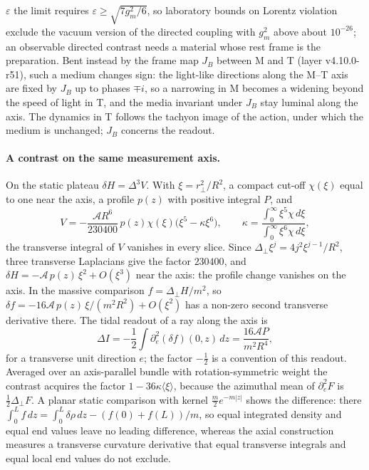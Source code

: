 \(\varepsilon\) the limit requires \(\varepsilon\ge\sqrt{7g_m^2/6}\), so laboratory bounds on Lorentz
violation exclude the vacuum version of the directed coupling with
\(g_m^2\) above about \(10^{-26}\); an observable directed contrast needs a
material whose rest frame is the preparation.  Bent instead by the frame
map \(J_B\) between M and T (layer v4.10.0-r51), such a medium changes sign:
the light-like directions along the M--T axis are fixed by \(J_B\) up to
phases \(\mp i\), so a narrowing in M becomes a widening beyond the speed of
light in T, and the media invariant under \(J_B\) stay luminal along the
axis.  The dynamics in T follows the tachyon image of the action, under
which the medium is unchanged; \(J_B\) concerns the readout.

\paragraph{A contrast on the same measurement axis.}
On the static plateau $\delta H=\Delta^3V$. With $\xi=r_\perp^2/R^2$, a
compact cut-off $\chi(\xi)$ equal to one near the axis, a profile $p(z)$
with positive integral $P$, and
\[
 V=-\frac{\mathcal A R^6}{230400}\,p(z)\chi(\xi)\bigl(\xi^5-\kappa\xi^6\bigr),
 \qquad
 \kappa=\frac{\int_0^\infty\xi^5\chi\,d\xi}{\int_0^\infty\xi^6\chi\,d\xi},
\]
the transverse integral of $V$ vanishes in every slice. Since
$\Delta_\perp\xi^j=4j^2\xi^{j-1}/R^2$, three transverse Laplacians give
the factor $230400$, and $\delta H=-\mathcal A\,p(z)\,\xi^2+O(\xi^3)$ near the
axis: the profile change vanishes on the axis. In the massive comparison
$f=\Delta_\perp H/m^2$, so $\delta f=-16\mathcal A\,p(z)\,\xi/(m^2R^2)+O(\xi^2)$
has a non-zero second transverse derivative there. The tidal readout of
a ray along the axis is
\[
 \Delta I=-\frac12\int\partial_e^2(\delta f)(0,z)\,dz
         =\frac{16\mathcal A P}{m^2R^4},
\]
for a transverse unit direction $e$; the factor $-\tfrac12$ is a
convention of this readout. Averaged over an axis-parallel bundle with
rotation-symmetric weight the contrast acquires the factor
$1-36\kappa\langle\xi\rangle$, because the azimuthal mean of $\partial_e^2F$ is
$\tfrac12\Delta_\perp F$. A planar static comparison with kernel
$\tfrac m2e^{-m|z|}$ shows the difference: there
$\int_0^Lf\,dz=\int_0^L\delta\rho\,dz-(f(0)+f(L))/m$, so equal
integrated density and equal end values leave no leading difference,
whereas the axial construction measures a transverse curvature
derivative that equal transverse integrals and equal local end values
do not exclude.

